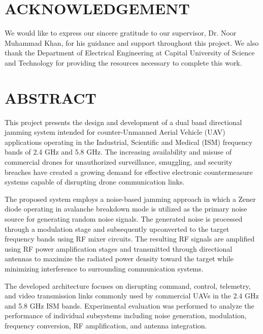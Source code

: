 \documentclass[12pt,a4paper]{report}
\begin{document}
	\newpage
	\chapter*{ACKNOWLEDGEMENT}
	
	We would like to express our sincere gratitude to our supervisor,
	Dr. Noor Muhammad Khan, for his guidance and support throughout this project.
	We also thank the Department of Electrical Engineering at Capital University
	of Science and Technology for providing the resources necessary to complete this work.
	
	
	\newpage
	\chapter*{ABSTRACT}
	
	This project presents the design and development of a dual band directional jamming system intended for counter-Unmanned Aerial Vehicle (UAV) applications operating in the Industrial, Scientific and Medical (ISM) frequency bands of 2.4 GHz and 5.8 GHz. The increasing availability and misuse of commercial drones for unauthorized surveillance, smuggling, and security breaches have created a growing demand for effective electronic countermeasure systems capable of disrupting drone communication links.
	
	The proposed system employs a noise-based jamming approach in which a Zener diode operating in avalanche breakdown mode is utilized as the primary noise source for generating random noise signals. The generated noise is processed through a modulation stage and subsequently upconverted to the target frequency bands using RF mixer circuits. The resulting RF signals are amplified using RF power amplification stages and transmitted through directional antennas to maximize the radiated power density toward the target while minimizing interference to surrounding communication systems.
	
	The developed architecture focuses on disrupting command, control, telemetry, and video transmission links commonly used by commercial UAVs in the 2.4 GHz and 5.8 GHz ISM bands. Experimental evaluation was performed to analyze the performance of individual subsystems including noise generation, modulation, frequency conversion, RF amplification, and antenna integration.
	
\end{document}
